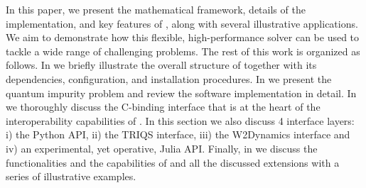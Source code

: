 \documentclass[edipack_sp.tex]{subfiles}
\begin{document}
In this paper, we present the mathematical framework, details of the implementation, and key features of \NAME, along with several illustrative applications. We aim to demonstrate how this flexible,
high-performance solver can be used to tackle a wide range of
challenging problems. 
The rest of this work is organized as follows. In  we 
briefly illustrate the overall structure of \NAME together with its dependencies, configuration, and installation procedures. In  we present the quantum impurity
problem and review the software implementation in detail. In  we thoroughly discuss the C-binding interface that is at the heart of the 
interoperability capabilities of \NAME. In this section we also discuss 4 interface layers: i) 
the Python API, ii) the TRIQS interface, iii) the W2Dynamics interface and iv) an experimental, yet operative, Julia API.
Finally, in  we discuss the functionalities and the capabilities of \NAME and  all the discussed extensions with a series of illustrative examples. 

\ifSubfilesClassLoaded{
  
}{}
\end{document}
